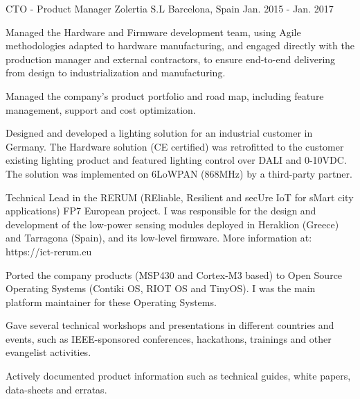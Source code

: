 
\begin{cventries}

  \cventry
    {CTO - Product Manager} %
    {Zolertia S.L} %
    {Barcelona, Spain} %
    {Jan. 2015 - Jan. 2017} %
    {
      \begin{cvitems} %
        \item {Managed the Hardware and Firmware development team, using Agile methodologies adapted to hardware manufacturing, and engaged directly with the production manager and external contractors, to ensure end-to-end delivering from design to industrialization and manufacturing.}
        \item {Managed the company's product portfolio and road map, including feature management, support and cost optimization.}
        \item {Designed and developed a lighting solution for an industrial customer in Germany.  The Hardware solution (CE certified) was retrofitted to the customer existing lighting product and featured lighting control over DALI and 0-10VDC.  The solution was implemented on 6LoWPAN (868MHz) by a third-party partner.}
        \item {Technical Lead in the RERUM (REliable, Resilient and secUre IoT for sMart city applications) FP7 European project.  I was responsible for the design and development of the low-power sensing modules deployed in Heraklion (Greece) and Tarragona (Spain), and its low-level firmware.  More information at: https://ict-rerum.eu}
        \item {Ported the company products (MSP430 and Cortex-M3 based) to Open Source Operating Systems (Contiki OS, RIOT OS and TinyOS). I was the main platform maintainer for these Operating Systems.}
        \item {Gave several technical workshops and presentations in different countries and events, such as IEEE-sponsored conferences, hackathons, trainings and other evangelist activities.}
        \item {Actively documented product information such as technical guides, white papers, data-sheets and erratas.}
      \end{cvitems}
    }


\end{cventries}
